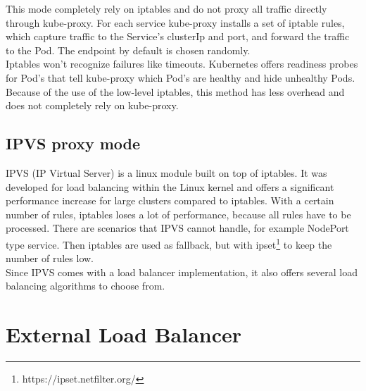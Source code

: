 This mode completely rely on iptables and do not proxy all traffic directly through kube-proxy.
For each service kube-proxy installs a set of iptable rules, which capture traffic to the Service's clusterIp and port, and forward the traffic to the Pod.
The endpoint by default is chosen randomly.
\\
Iptables won't recognize failures like timeouts.
Kubernetes offers readiness probes for Pod's that tell kube-proxy which Pod's are healthy and hide unhealthy Pods.
\\
Because of the use of the low-level iptables, this method has less overhead and does not completely rely on kube-proxy.~\cite{KUBERNETES-SERVICE}

\subsection{IPVS proxy mode}

IPVS (IP Virtual Server) is a linux module built on top of iptables.
It was developed for load balancing within the Linux kernel and offers a significant performance increase for large clusters compared to iptables.
With a certain number of rules, iptables loses a lot of performance, because all rules have to be processed.
There are scenarios that IPVS cannot handle, for example NodePort type service.
Then iptables are used as fallback, but with ipset\footnote{https://ipset.netfilter.org/} to keep the number of rules low.
\\
Since IPVS comes with a load balancer implementation, it also offers several load balancing algorithms to choose from.~\cite{KUBERNETES-SERVICE}

\section{External Load Balancer}\label{sec:ExternalLoadBalancer}

